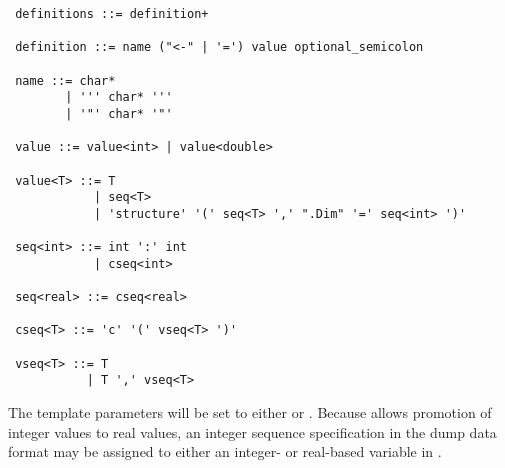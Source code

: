 {\small 
\begin{verbatim}
 definitions ::= definition+

 definition ::= name ("<-" | '=') value optional_semicolon

 name ::= char* 
        | ''' char* ''' 
        | '"' char* '"'

 value ::= value<int> | value<double>

 value<T> ::= T 
            | seq<T>
            | 'structure' '(' seq<T> ',' ".Dim" '=' seq<int> ')'

 seq<int> ::= int ':' int
            | cseq<int>

 seq<real> ::= cseq<real>

 cseq<T> ::= 'c' '(' vseq<T> ')'

 vseq<T> ::= T
           | T ',' vseq<T>
\end{verbatim}
}
\noindent
The template parameters  will be set to either  or
.  Because \Stan allows promotion of integer values to real
values, an integer sequence specification in the dump data format may
be assigned to either an integer- or real-based variable in \Stan.










